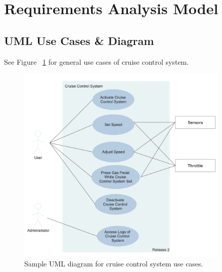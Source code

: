 \documentclass[preprint,11pt,3p]{article}
\begin{document}
\section{Requirements Analysis Model}

\subsection{UML Use Cases \& Diagram} 
See Figure ~\ref{fig:ccUML1} for general use cases of cruise control system.
	\begin{figure}[H]
		\includegraphics[width=0.9\textwidth]{images/ccUseCaseUML.png}
		\caption{Sample UML diagram for cruise control system use cases.}
		\label{fig:ccUML1}
	\end{figure}
\end{document}
